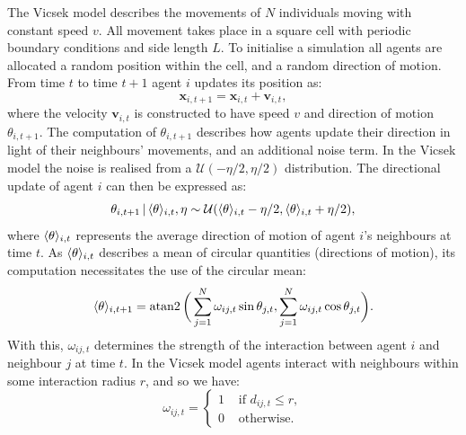 The Vicsek model describes the movements of $N$ individuals moving with constant speed
$v$. All movement takes place in a square cell with periodic boundary conditions and side
length $L$. To initialise a simulation all agents are allocated a random position within
the cell, and a random direction of motion. From time $t$ to time $t+1$ agent $i$ updates
its position as:
\begin{equation*}
    \bm{x}_{i, t+1} = \bm{x}_{i, t} + \bm{v}_{i, t},
\end{equation*}
where the velocity $\bm{v}_{i,t}$ is constructed to have speed $v$ and direction of
motion $\theta_{i, t+1}$. The computation of $\theta_{i, t+1}$ describes how agents update
their direction in light of their neighbours' movements, and an additional noise term. In
the Vicsek model the noise is realised from a $\mathcal{U}(-\eta/2, \eta/2)$
distribution. The directional update of agent $i$ can then be expressed as:
\begin{equation}
    \label{eq:vicsek_update}
    \theta_{i, t+1} \,|\, \langle\theta\rangle_{i, t}, \eta \sim
                     \mathcal{U}(\langle\theta\rangle_{i, t} - \eta/2,
                                 \langle\theta\rangle_{i, t} + \eta/2),
\end{equation}
where $\langle\theta\rangle_{i, t}$ represents the average direction of motion of agent $i$'s
neighbours at time $t$. As $\langle\theta\rangle_{i, t}$ describes a mean of circular
quantities (directions of motion), its computation necessitates the use of the
circular mean:
\begin{equation*}
    \langle\theta\rangle_{i, t+1} = \operatorname{atan2}\bigg(
        \sum_{j=1}^N \omega_{ij, t} \sin\theta_{j,t},
        \sum_{j=1}^N \omega_{ij, t} \cos\theta_{j,t}
    \bigg).
\end{equation*}
With this, $\omega_{ij, t}$ determines the strength of the interaction between agent $i$
and neighbour $j$ at time $t$. In the Vicsek model agents interact with neighbours within
some interaction radius $r$, and so we have:
\begin{equation*}
    \omega_{ij,t} =
    \begin{cases}
        1 & \text{ if } d_{ij, t} \leq r,\\
        0 & \text{ otherwise.}
    \end{cases}
\end{equation*}

